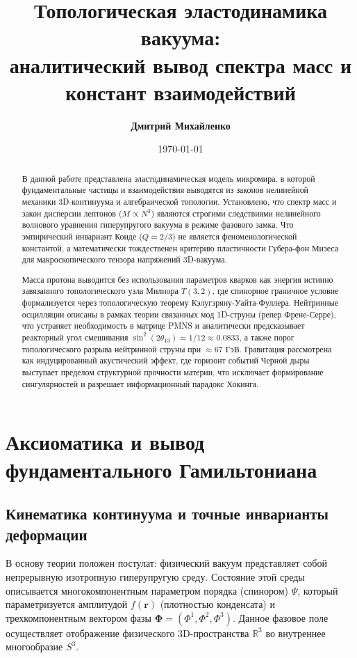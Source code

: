 \documentclass[12pt,a4paper]{article}
\title{\textbf{Топологическая эластодинамика вакуума:\\ аналитический вывод спектра масс и констант взаимодействий}}
\author{\textbf{Дмитрий Михайленко}}
\date{\today}
\begin{document}
	
	\maketitle
	
	\begin{abstract}
		В данной работе представлена эластодинамическая модель микромира, в которой фундаментальные частицы и взаимодействия выводятся из законов нелинейной механики 3D-континуума и алгебраической топологии. Установлено, что спектр масс и закон дисперсии лептонов ($M \propto N^3$) являются строгими следствиями нелинейного волнового уравнения гиперупругого вакуума в режиме фазового замка. Что эмпирический инвариант Коиде ($Q=2/3$) не является феноменологической константой, а математически тождественен критерию пластичности Губера-фон Мизеса для макроскопического тензора напряжений 3D-вакуума.
		
		Масса протона выводится без использования параметров кварков как энергия истинно завязанного топологического узла Милнора $T(3,2)$, где спинорное граничное условие формализуется через топологическую теорему Кэлугэряну-Уайта-Фуллера. Нейтринные осцилляции описаны в рамках теории связанных мод 1D-струны (репер Френе-Серре), что устраняет необходимость в матрице PMNS и аналитически предсказывает реакторный угол смешивания $\sin^2(2\theta_{13}) = 1/12 \approx 0.0833$, а также порог топологического разрыва нейтринной струны при $\approx 67$ ГэВ. 
		Гравитация рассмотрена как индуцированный акустический эффект, где горизонт событий Черной дыры выступает пределом структурной прочности материи, что исключает формирование сингулярностей и разрешает информационный парадокс Хокинга.
	\end{abstract}
	
	\tableofcontents
	\newpage
	
\section{Аксиоматика и вывод фундаментального Гамильтониана}

\subsection{Кинематика континуума и точные инварианты деформации}
В основу теории положен постулат: физический вакуум представляет собой непрерывную изотропную гиперупругую среду. Состояние этой среды описывается многокомпонентным параметром порядка (спинором) $\Psi$, который параметризуется амплитудой $f(\mathbf{r})$ (плотностью конденсата) и трехкомпонентным вектором фазы $\boldsymbol{\Phi} = (\Phi^1, \Phi^2, \Phi^3)$. Данное фазовое поле осуществляет отображение физического 3D-пространства $\mathbb{R}^3$ во внутреннее многообразие $S^3$.
\end{document}
